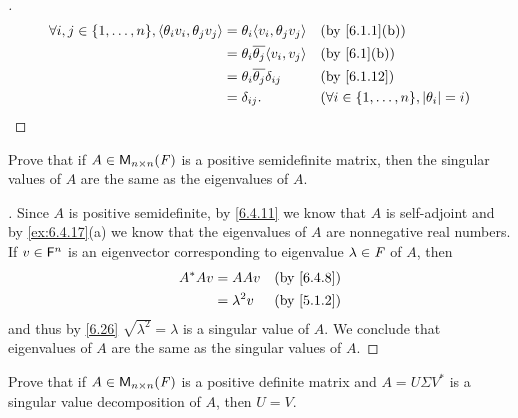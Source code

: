 \begin{proof}[]
\begin{align*}
    \forall i, j \in \set{1, \dots, n}, \inn{\theta_i v_i, \theta_j v_j} & = \theta_i \inn{v_i, \theta_j v_j}        &  & \by{6.1.1}[b]                                         \\
                                                                         & = \theta_i \conj{\theta_j} \inn{v_i, v_j} &  & \by{6.1}[b]                                           \\
                                                                         & = \theta_i \conj{\theta_j} \delta_{i j}   &  & \by{6.1.12}                                           \\
                                                                         & = \delta_{i j}.                           &  & (\forall i \in \set{1, \dots, n}, \abs{\theta_i} = i)
  \end{align*}
\end{proof}

\begin{ex}\label{ex:6.7.13}
  Prove that if \(A \in \ms[n][n][\F]\) is a positive semidefinite matrix, then the singular values of \(A\) are the same as the eigenvalues of \(A\).
\end{ex}

\begin{proof}[]
  Since \(A\) is positive semidefinite, by \cref{6.4.11} we know that \(A\) is self-adjoint and by \cref{ex:6.4.17}(a) we know that the eigenvalues of \(A\) are nonnegative real numbers.
  If \(v \in \mathsf{F}^n\) is an eigenvector corresponding to eigenvalue \(\lambda \in \mathit{F}\) of \(A\), then
  \begin{align*}
    A^* A v & = A A v       &  & \by{6.4.8} \\
            & = \lambda^2 v &  & \by{5.1.2}
  \end{align*}
  and thus by \cref{6.26} \(\sqrt{\lambda^2} = \lambda\) is a singular value of \(A\).
  We conclude that eigenvalues of \(A\) are the same as the singular values of \(A\).
\end{proof}

\begin{ex}\label{ex:6.7.14}
  Prove that if \(A \in \ms[n][n][\F]\) is a positive definite matrix and \(A = U \Sigma V^*\) is a singular value decomposition of \(A\), then \(U = V\).
\end{ex}

